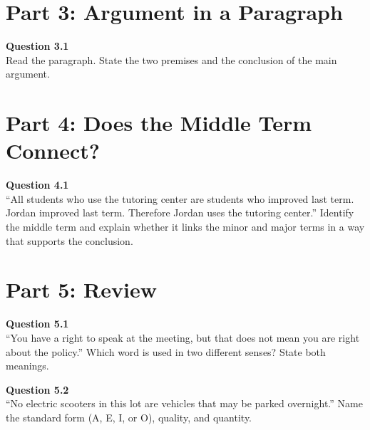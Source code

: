 \documentclass[12pt]{article}
\begin{document}

\newpage

\section*{Part 3: Argument in a Paragraph}

\textbf{Question 3.1}\\[-0.15em]
Read the paragraph. State the two premises and the conclusion of the main argument.

\vspace{0.2em}

\noindent{}


\newpage

\section*{Part 4: Does the Middle Term Connect?}

\textbf{Question 4.1}\\[-0.15em]
``All students who use the tutoring center are students who improved last term. Jordan improved last term. Therefore Jordan uses the tutoring center.'' Identify the middle term and explain whether it links the minor and major terms in a way that supports the conclusion.


\newpage

\section*{Part 5: Review}

\textbf{Question 5.1}\\[-0.15em]
``You have a right to speak at the meeting, but that does not mean you are right about the policy.'' Which word is used in two different senses? State both meanings.


\textbf{Question 5.2}\\[-0.15em]
``No electric scooters in this lot are vehicles that may be parked overnight.'' Name the standard form (A, E, I, or O), quality, and quantity.

\end{document}

